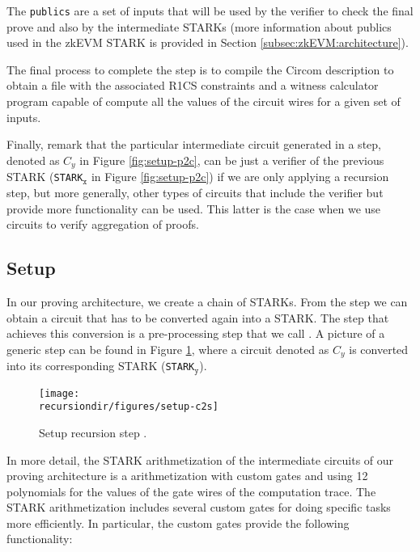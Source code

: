 The \texttt{publics} are a set of inputs that will be used by the verifier to check the final prove and also by the intermediate STARKs (more information about publics used in the zkEVM STARK is provided in Section \ref{subsec:zkEVM:architecture}).

The final process to complete the \stoc step is to compile the Circom description to obtain a file with the associated R1CS constraints and a witness calculator program capable of compute all the values of the circuit wires for a given set of inputs.

Finally, remark that the particular intermediate circuit generated in a \stoc step,  denoted as $C_y$ in Figure \ref{fig:setup-p2c}, can be just a verifier of the previous STARK (\texttt{STARK}$_\texttt{x}$ in Figure \ref{fig:setup-p2c}) if we are only applying a recursion step, but more generally, other types of circuits that include the verifier but provide more functionality can be used. 
This latter is the case when we use circuits to verify aggregation of proofs.


\subsection{Setup \ctos \label{subsec:ctos}}

In our proving architecture, we create a chain of STARKs. 
From the \stoc step we can obtain a circuit that has to be converted again 
into a STARK. 
The step that achieves this conversion is a pre-processing step 
that we call \ctos. A picture of a generic \ctos step can be found in Figure \ref{fig:setup-c2s}, where a circuit denoted as $C_y$
is converted into its corresponding STARK (\texttt{STARK}$_\texttt{y}$).

\begin{figure}[H]
\centering
\texttt{[image: \\recursiondir/figures/setup-c2s]}
\caption{Setup recursion step \ctos.}
\label{fig:setup-c2s}
\end{figure}

In more detail, the STARK arithmetization of the intermediate circuits of our proving architecture is a  arithmetization with custom gates and using 12 polynomials for the values of the gate wires of the computation trace. The STARK arithmetization includes several custom gates for doing specific tasks more efficiently. In particular, the custom gates provide the following functionality:

